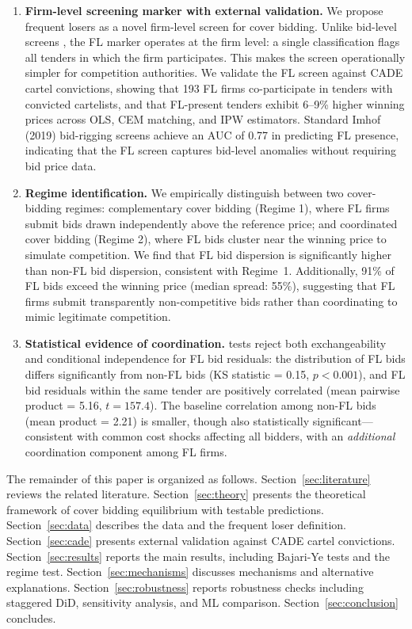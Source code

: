 \documentclass[12pt]{elsarticle}
\begin{document}
\begin{enumerate}
\item \textbf{Firm-level screening marker with external validation.} We propose frequent losers as a novel firm-level screen for cover bidding. Unlike bid-level screens \citep{bajari2003deciding, imhof2019detecting}, the FL marker operates at the firm level: a single classification flags all tenders in which the firm participates. This makes the screen operationally simpler for competition authorities. We validate the FL screen against CADE cartel convictions, showing that 193 FL firms co-participate in tenders with convicted cartelists, and that FL-present tenders exhibit 6--9\% higher winning prices across OLS, CEM matching, and IPW estimators. Standard Imhof (2019) bid-rigging screens achieve an AUC of 0.77 in predicting FL presence, indicating that the FL screen captures bid-level anomalies without requiring bid price data.

\item \textbf{Regime identification.} We empirically distinguish between two cover-bidding regimes: complementary cover bidding (Regime 1), where FL firms submit bids drawn independently above the reference price; and coordinated cover bidding (Regime 2), where FL bids cluster near the winning price to simulate competition. We find that FL bid dispersion is significantly higher than non-FL bid dispersion, consistent with Regime~1. Additionally, 91\% of FL bids exceed the winning price (median spread: 55\%), suggesting that FL firms submit transparently non-competitive bids rather than coordinating to mimic legitimate competition.

\item \textbf{Statistical evidence of coordination.} \citet{bajari2003deciding} tests reject both exchangeability and conditional independence for FL bid residuals: the distribution of FL bids differs significantly from non-FL bids (KS statistic = 0.15, $p < 0.001$), and FL bid residuals within the same tender are positively correlated (mean pairwise product = 5.16, $t = 157.4$). The baseline correlation among non-FL bids (mean product = 2.21) is smaller, though also statistically significant---consistent with common cost shocks affecting all bidders, with an \textit{additional} coordination component among FL firms.
\end{enumerate}

The remainder of this paper is organized as follows. Section~\ref{sec:literature} reviews the related literature. Section~\ref{sec:theory} presents the theoretical framework of cover bidding equilibrium with testable predictions. Section~\ref{sec:data} describes the data and the frequent loser definition. Section~\ref{sec:cade} presents external validation against CADE cartel convictions. Section~\ref{sec:results} reports the main results, including Bajari-Ye tests and the regime test. Section~\ref{sec:mechanisms} discusses mechanisms and alternative explanations. Section~\ref{sec:robustness} reports robustness checks including staggered DiD, sensitivity analysis, and ML comparison. Section~\ref{sec:conclusion} concludes.
\end{document}
